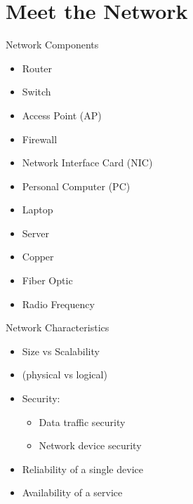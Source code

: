 \section[meet]{Meet the Network}

\begin{frame}{Network Components}
	\begin{itemize}[<2->]
		\item Router
		\item Switch
		\item Access Point (AP)
		\item Firewall
		\item Network Interface Card (NIC)
	\end{itemize}
	\begin{itemize}[<3->]
		\item Personal Computer (PC)
		\item Laptop
		\item Server
	\end{itemize}
	\begin{itemize}[<4->]
		\item Copper
		\item Fiber Optic
		\item Radio Frequency
	\end{itemize}
\end{frame}

\begin{frame}{Network Characteristics}
	\begin{itemize}[<+->]
		\item Size vs Scalability
		\item {} (physical vs logical)
		\item Security:
		\begin{itemize}
			\item Data traffic security
			\item Network device security
		\end{itemize}
		\item Reliability of a single device
		\item Availability of a service
	\end{itemize}
\end{frame}

